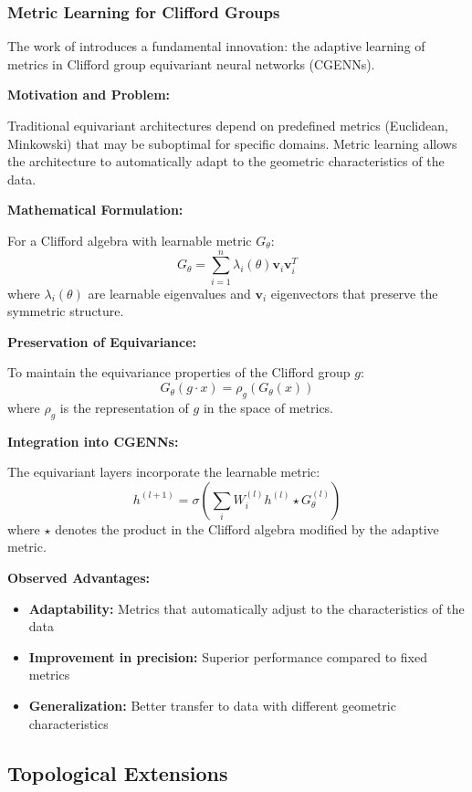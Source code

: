 \subsubsection{Metric Learning for Clifford Groups}

The work of \citet{ali2024metric} introduces a fundamental innovation: the adaptive learning of metrics in Clifford group equivariant neural networks (CGENNs).

\textbf{Motivation and Problem:}

Traditional equivariant architectures depend on predefined metrics (Euclidean, Minkowski) that may be suboptimal for specific domains. Metric learning allows the architecture to automatically adapt to the geometric characteristics of the data.

\textbf{Mathematical Formulation:}

For a Clifford algebra with learnable metric $G_\theta$:
\[G_\theta = \sum_{i=1}^n \lambda_i(\theta) \mathbf{v}_i \mathbf{v}_i^T\]
where $\lambda_i(\theta)$ are learnable eigenvalues and $\mathbf{v}_i$ eigenvectors that preserve the symmetric structure.

\textbf{Preservation of Equivariance:}

To maintain the equivariance properties of the Clifford group $g$:
\[G_\theta(g \cdot x) = \rho_g(G_\theta(x))\]
where $\rho_g$ is the representation of $g$ in the space of metrics.

\textbf{Integration into CGENNs:}

The equivariant layers incorporate the learnable metric:
\[h^{(l+1)} = \sigma\left(\sum_i W_i^{(l)} h^{(l)} \star G_\theta^{(l)}\right)\]
where $\star$ denotes the product in the Clifford algebra modified by the adaptive metric.

\textbf{Observed Advantages:}
\begin{itemize}
    \item \textbf{Adaptability:} Metrics that automatically adjust to the characteristics of the data
    \item \textbf{Improvement in precision:} Superior performance compared to fixed metrics
    \item \textbf{Generalization:} Better transfer to data with different geometric characteristics
\end{itemize}

\subsection{Topological Extensions}

